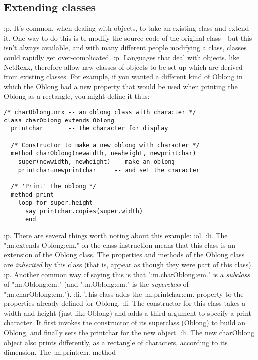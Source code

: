 \subsection{Extending classes}\label{refoexten}
:p.
It's common, when dealing with objects, to take an existing class and
extend it.  One way to do this is to modify the source code of the
original class - but this isn't always available, and with many
different people modifying a class, classes could rapidly get
over-complicated.
:p.
Languages that deal with objects, like NetRexx, therefore allow new
classes of objects to be set up which are derived from existing classes.
For example, if you wanted a different kind of Oblong in which the
Oblong had a new property that would be used when printing the Oblong as
a rectangle, you might define it thus:
\begin{verbatim}
/* charOblong.nrx -- an oblong class with character */
class charOblong extends Oblong
  printchar       -- the character for display

  /* Constructor to make a new oblong with character */
  method charOblong(newwidth, newheight, newprintchar)
    super(newwidth, newheight) -- make an oblong
    printchar=newprintchar     -- and set the character

  /* 'Print' the oblong */
  method print
    loop for super.height
      say printchar.copies(super.width)
      end
\end{verbatim}
:p.
There are several things worth noting about this example:
:ol.
:li.
The ":m.extends Oblong:em." on the class instruction means that
this class is an extension of the Oblong class.  The properties and
methods of the Oblong class are \emph{inherited} by this class (that
is, appear as though they were part of this class).
:p.
Another common way of saying this is that ":m.charOblong:em."
is a \emph{subclass} of ":m.Oblong:em." (and
":m.Oblong:em." is the \emph{superclass} of
":m.charOblong:em.").
:li.
This class adds the :m.printchar:em. property to the properties
already defined for Oblong.
:li.
The constructor for this class takes a width and height (just like
Oblong) and adds a third argument to specify a print character.  It
first invokes the constructor of its superclass (Oblong) to build
an Oblong, and finally sets the printchar for the new object.
:li.
The new charOblong object also prints differently, as a rectangle
of characters, according to its dimension.  The :m.print:em. method
